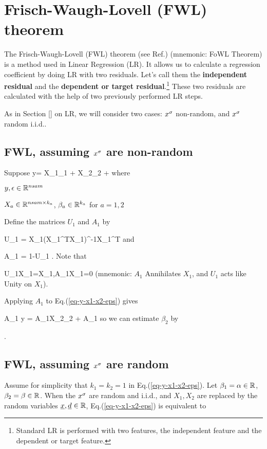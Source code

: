 \chapter{Frisch-Waugh-Lovell (FWL) theorem}
\label{ch-fwl-theo}

The Frisch-Waugh-Lovell (FWL) theorem
(see Ref.\cite{wiki-fwl-theo})
(mnemonic: FoWL Theorem)
is a method used in Linear Regression (LR).
It allows us to
calculate
a regression coefficient
by doing LR with two residuals. Let's call them
the {\bf independent residual} and the
{\bf dependent or target residual}.\footnote{Standard 
LR is performed with two features,
the independent feature and the dependent or target feature.}
These  two residuals are calculated 
with the help of two previously
performed LR steps.

As in Section []
on LR, we will consider
two cases: $x^\sigma$ non-random, and $x^\sigma$ random i.i.d..

\section{FWL, assuming $x^\sigma$ are non-random}
Suppose
\beq
y=  X_1\beta_1 + X_2\beta_2 + \eps
\label{eq-y-x1-x2-eps}
\eeq
where

$y, \epsilon\in { \mathbb{R}}^{nsam}$

$X_a\in { \mathbb{R}}^{nsam\times k_a}$,
$\beta_a\in { \mathbb{R}}^{k_a}$ for $a=1,2$

Define the matrices $U_1$ and $A_1$ by

\beq
U_1 = X_1(X_1^TX_1)^{-1}X_1^T
\eeq
and

\beq
A_1 = 1-U_1
\;.
\eeq
Note that

\beq
U_1X_1=X_1\;,\;\;A_1X_1=0
\eeq
(mnemonic: $A_1$ Annihilates $X_1$,
and $U_1$ acts like Unity on $X_1$).

Applying $A_1$ to Eq.(\ref{eq-y-x1-x2-eps}) gives

\beq
A_1 y = A_1X_2\beta_2  + A_1\eps
\eeq
so we can estimate $\beta_2$ by

\beq
{}
\label{eq-fwl-nonrand}
\;.
\eeq
\section{FWL, assuming $x^\sigma$ are random}


Assume for simplicity that 
$k_1=k_2=1$
in Eq.(\ref{eq-y-x1-x2-eps}). Let
$\beta_1=\alpha\in{ \mathbb{R}}$, 
$\beta_2=\beta\in{ \mathbb{R}}$.
When the $x^\sigma$ are random and i.i.d.,
and
$X_1, X_2$ are
replaced by 
the random variables
${\underline{x}}, {\underline{d}}\in { \mathbb{R}}$,
Eq.(\ref{eq-y-x1-x2-eps})
is equivalent to


